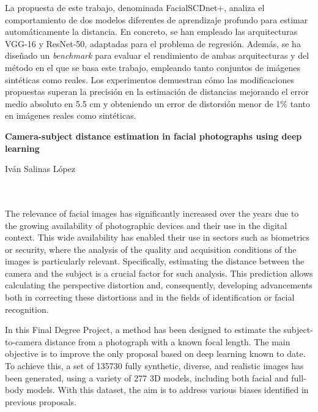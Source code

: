 La propuesta de este trabajo, denominada FacialSCDnet+, analiza el comportamiento de dos modelos diferentes de aprendizaje profundo para estimar automáticamente la distancia. En concreto, se han empleado las arquitecturas VGG-16 y ResNet-50, adaptadas para el problema de regresión. Además, se ha diseñado un \textit{benchmark} para evaluar el rendimiento de ambas arquitecturas y del método en el que se basa este trabajo, empleando tanto conjuntos de imágenes sintéticas como reales. Los experimentos demuestran cómo las modificaciones propuestas superan la precisión en la estimación de distancias mejorando el error medio absoluto en 5.5 cm y obteniendo un error de distorsión menor de 1\% tanto en imágenes reales como sintéticas.

\cleardoublepage


\thispagestyle{empty}


\begin{center}
{\large\bfseries Camera-subject distance estimation in facial photographs using deep learning}\\
\end{center}
\begin{center}
Iván Salinas López\\
\end{center}

\\

\vspace{0.7cm}
\\

The relevance of facial images has significantly increased over the years due to the growing availability of photographic devices and their use in the digital context. This wide availability has enabled their use in sectors such as biometrics or security, where the analysis of the quality and acquisition conditions of the images is particularly relevant. Specifically, estimating the distance between the camera and the subject is a crucial factor for such analysis. This prediction allows calculating the perspective distortion and, consequently, developing advancements both in correcting these distortions and in the fields of identification or facial recognition.

In this Final Degree Project, a method has been designed to estimate the subject-to-camera distance from a photograph with a known focal length. The main objective is to improve the only proposal based on deep learning known to date. To achieve this, a set of 135730 fully synthetic, diverse, and realistic images has been generated, using a variety of 277 3D models, including both facial and full-body models. With this dataset, the aim is to address various biases identified in previous proposals.

